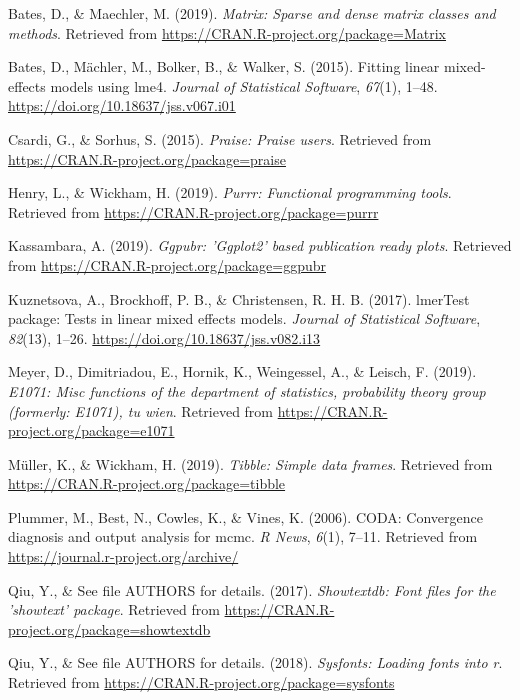 \documentclass[english,man,floatsintext]{apa6}
\begin{document}
\leavevmode\hypertarget{ref-R-Matrix}{}%
Bates, D., \& Maechler, M. (2019). \emph{Matrix: Sparse and dense matrix classes and methods}. Retrieved from \url{https://CRAN.R-project.org/package=Matrix}

\leavevmode\hypertarget{ref-R-lme4}{}%
Bates, D., Mächler, M., Bolker, B., \& Walker, S. (2015). Fitting linear mixed-effects models using lme4. \emph{Journal of Statistical Software}, \emph{67}(1), 1--48. \url{https://doi.org/10.18637/jss.v067.i01}

\leavevmode\hypertarget{ref-R-praise}{}%
Csardi, G., \& Sorhus, S. (2015). \emph{Praise: Praise users}. Retrieved from \url{https://CRAN.R-project.org/package=praise}

\leavevmode\hypertarget{ref-R-purrr}{}%
Henry, L., \& Wickham, H. (2019). \emph{Purrr: Functional programming tools}. Retrieved from \url{https://CRAN.R-project.org/package=purrr}

\leavevmode\hypertarget{ref-R-ggpubr}{}%
Kassambara, A. (2019). \emph{Ggpubr: 'Ggplot2' based publication ready plots}. Retrieved from \url{https://CRAN.R-project.org/package=ggpubr}

\leavevmode\hypertarget{ref-R-lmerTest}{}%
Kuznetsova, A., Brockhoff, P. B., \& Christensen, R. H. B. (2017). lmerTest package: Tests in linear mixed effects models. \emph{Journal of Statistical Software}, \emph{82}(13), 1--26. \url{https://doi.org/10.18637/jss.v082.i13}

\leavevmode\hypertarget{ref-R-e1071}{}%
Meyer, D., Dimitriadou, E., Hornik, K., Weingessel, A., \& Leisch, F. (2019). \emph{E1071: Misc functions of the department of statistics, probability theory group (formerly: E1071), tu wien}. Retrieved from \url{https://CRAN.R-project.org/package=e1071}

\leavevmode\hypertarget{ref-R-tibble}{}%
Müller, K., \& Wickham, H. (2019). \emph{Tibble: Simple data frames}. Retrieved from \url{https://CRAN.R-project.org/package=tibble}

\leavevmode\hypertarget{ref-R-coda}{}%
Plummer, M., Best, N., Cowles, K., \& Vines, K. (2006). CODA: Convergence diagnosis and output analysis for mcmc. \emph{R News}, \emph{6}(1), 7--11. Retrieved from \url{https://journal.r-project.org/archive/}

\leavevmode\hypertarget{ref-R-showtextdb}{}%
Qiu, Y., \& See file AUTHORS for details. (2017). \emph{Showtextdb: Font files for the 'showtext' package}. Retrieved from \url{https://CRAN.R-project.org/package=showtextdb}

\leavevmode\hypertarget{ref-R-sysfonts}{}%
Qiu, Y., \& See file AUTHORS for details. (2018). \emph{Sysfonts: Loading fonts into r}. Retrieved from \url{https://CRAN.R-project.org/package=sysfonts}
\end{document}
